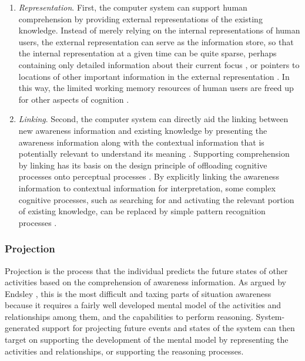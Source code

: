 \begin{enumerate}
   \item \emph{Representation}. First, the computer system can support human comprehension by providing external representations of the existing knowledge. Instead of merely relying on the internal representations of human users, the external representation can serve as the information store, so that the internal representation at a given time can be quite sparse, perhaps containing only detailed information about their current focus \cite{Hegarty2011}, or pointers to locations of other important information in the external representation \cite{M.1996}. In this way, the limited working memory resources of human users are freed up for other aspects of cognition \cite{M.1996}.
   \item \emph{Linking}. Second, the computer system can directly aid the linking between new awareness information and existing knowledge by presenting the awareness information along with the contextual information that is potentially relevant to understand its meaning \cite{Tomaszewski2010}. Supporting comprehension by linking has its basis on the design principle of offloading cognitive processes onto perceptual processes \cite{M.1996}. By explicitly linking the awareness information to contextual information for interpretation, some complex cognitive processes, such as searching for and activating the relevant portion of existing knowledge, can be replaced by simple pattern recognition processes \cite{Hegarty2011}. 
\end{enumerate}

\subsubsection*{Projection} %
\label{ssub:projection}
Projection is the process that the individual predicts the future states of other activities based on the comprehension of awareness information. As argued by Endsley \cite{Endsley1995}, this is the most difficult and taxing parts of situation awareness because it requires a fairly well developed mental model of the activities and relationships among them, and the capabilities to perform reasoning. System-generated support for projecting future events and states of the system can then target on supporting the development of the mental model by representing the activities and relationships, or supporting the reasoning processes. 

